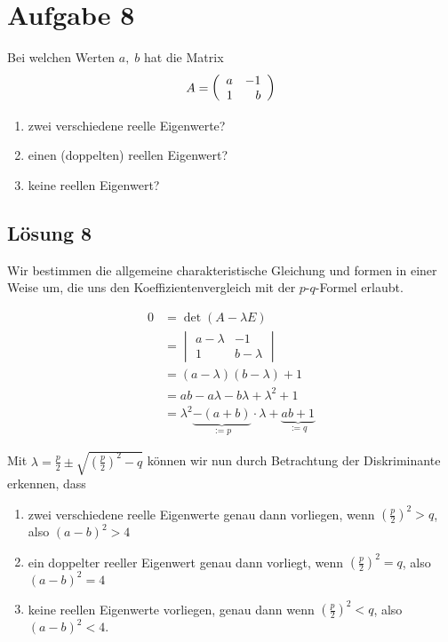 \documentclass[main.tex]{subfiles}
\begin{document}
\section{Aufgabe 8}
Bei welchen Werten $a,\; b$ hat die Matrix
$$
    A = \eqmatrix{rr}{a & -1 \\ 1 & b}
$$
\begin{enumerate}
    \item zwei verschiedene reelle Eigenwerte?
    \item einen (doppelten) reellen Eigenwert?
    \item keine reellen Eigenwert?
\end{enumerate}

\subsection{Lösung 8}
Wir bestimmen die allgemeine charakteristische Gleichung und formen in einer Weise um, die uns den Koeffizientenvergleich mit der $p$-$q$-Formel erlaubt.

\begin{align*}
    0 &= \det (A-\lambda E) \\
    &= \begin{vmatrix}
        a -\lambda & -1 \\ 1 & b-\lambda
    \end{vmatrix} \\[1mm]
    &= (a-\lambda)(b-\lambda)+1 \\[1mm]
    &= ab -a\lambda -b\lambda + \lambda^2 + 1 \\[1mm]
    &= \lambda^2 \underbrace{-(a+b)}_{:= p}\cdot \lambda + \underbrace{ab +1}_{:= q}
\end{align*}

Mit $\lambda = \frac{p}{2} \pm \sqrt{\left(\frac{p}{2}\right)^2 -q}$ können wir nun durch Betrachtung der Diskriminante erkennen, dass
\begin{enumerate}
    \item zwei verschiedene reelle Eigenwerte genau dann vorliegen, wenn $\left(\frac{p}{2}\right)^2 > q$, also $(a-b)^2 > 4$
    \item ein doppelter reeller Eigenwert genau dann vorliegt, wenn $\left(\frac{p}{2}\right)^2 = q$, also $(a-b)^2 = 4$
    \item keine reellen Eigenwerte vorliegen, genau dann wenn $\left(\frac{p}{2}\right)^2 < q$, also $(a-b)^2 < 4$.
\end{enumerate}
\end{document}
